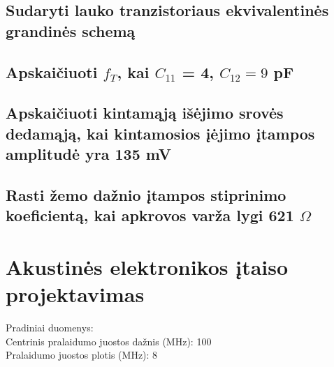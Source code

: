 \documentclass[11pt,a4paper]{article}
\begin{document}
\subsection{Sudaryti lauko tranzistoriaus ekvivalentinės grandinės schemą}
\subsection{Apskaičiuoti $f_{T}$, kai $C_{11}$ = 4, $C_{12} = 9$ pF}
\subsection{Apskaičiuoti kintamąją išėjimo srovės dedamąją, kai kintamosios įėjimo įtampos amplitudė yra 135 mV}
\subsection{Rasti žemo dažnio įtampos stiprinimo koeficientą, kai apkrovos varža lygi 621 $\Omega$}

\section{Akustinės elektronikos įtaiso projektavimas}
Pradiniai duomenys:\\
Centrinis pralaidumo juostos dažnis (MHz): 100\\
Pralaidumo juostos plotis (MHz): 8
\end{document}
